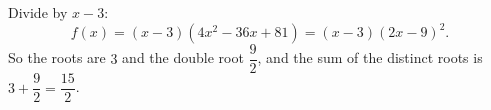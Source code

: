 Divide by $x-3$:
\[
f(x)=(x-3)\left(4x^2-36x+81\right)=(x-3)(2x-9)^2 .
\]
So the roots are $3$ and the double root $\dfrac{9}{2}$, and the sum of the distinct roots is $3+\dfrac{9}{2}=\boxed{\dfrac{15}{2}}$.

